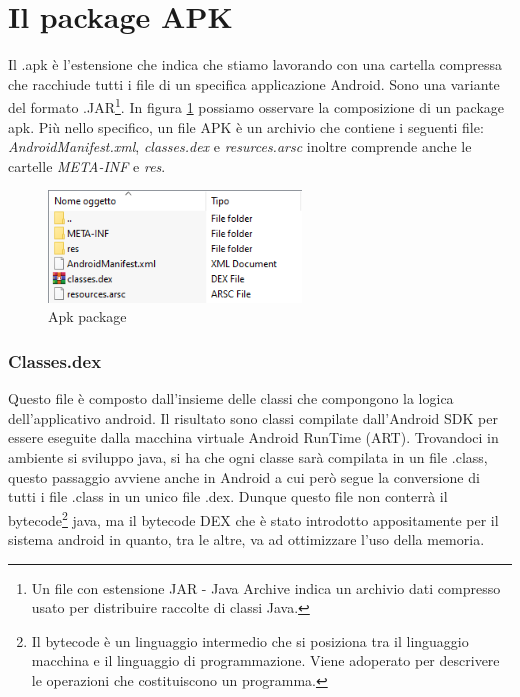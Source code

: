 \section{Il package APK}
\label{sub:apk}
Il .apk è l'estensione che indica che stiamo lavorando con una cartella compressa che racchiude tutti i file di un specifica applicazione Android. Sono una variante del formato .JAR\footnote{Un file con estensione JAR - Java Archive indica un archivio dati compresso usato per distribuire raccolte di classi Java.}. In figura \ref{fig:apkPack} possiamo osservare la composizione di un package apk. Più nello specifico, un file APK è un archivio che contiene i seguenti file: 
\textit{AndroidManifest.xml}, \textit{classes.dex} e \textit{resurces.arsc} inoltre comprende anche le cartelle \textit{META-INF} e \textit{res}.
        \begin{figure}[h]
        \centering
        \includegraphics[width=0.6\textwidth]{imgs/capitolo2/Applicazioni/apk ins.png}
        \caption{Apk package}
        \label{fig:apkPack}
        \end{figure}
    \FloatBarrier %
\subsubsection{Classes.dex}    
Questo file è composto dall'insieme delle classi che compongono la logica dell'applicativo android. Il risultato sono classi compilate dall'Android SDK per essere eseguite dalla macchina virtuale Android RunTime (ART). Trovandoci in ambiente si sviluppo java, si ha che ogni classe sarà compilata in un file .class, questo passaggio avviene anche in Android a cui però segue la conversione di tutti i file .class in un unico file .dex. Dunque questo file non conterrà il bytecode\footnote{Il bytecode è un linguaggio intermedio che si posiziona tra il linguaggio macchina e il linguaggio di programmazione. Viene adoperato per descrivere le operazioni che costituiscono un programma.} java, ma il bytecode DEX che è stato introdotto appositamente per il sistema android in quanto, tra le altre, va ad ottimizzare l'uso della memoria.
